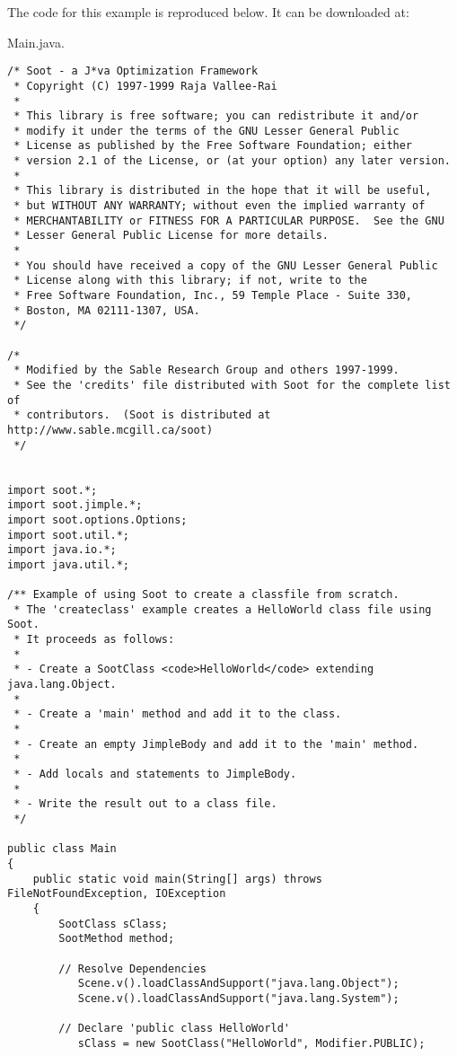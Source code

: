 \documentclass{article}
\begin{document}
The code for this example is reproduced below. It can be downloaded
at:

{Main.java}.

\begin{verbatim}
/* Soot - a J*va Optimization Framework
 * Copyright (C) 1997-1999 Raja Vallee-Rai
 *
 * This library is free software; you can redistribute it and/or
 * modify it under the terms of the GNU Lesser General Public
 * License as published by the Free Software Foundation; either
 * version 2.1 of the License, or (at your option) any later version.
 *
 * This library is distributed in the hope that it will be useful,
 * but WITHOUT ANY WARRANTY; without even the implied warranty of
 * MERCHANTABILITY or FITNESS FOR A PARTICULAR PURPOSE.  See the GNU
 * Lesser General Public License for more details.
 *
 * You should have received a copy of the GNU Lesser General Public
 * License along with this library; if not, write to the
 * Free Software Foundation, Inc., 59 Temple Place - Suite 330,
 * Boston, MA 02111-1307, USA.
 */

/*
 * Modified by the Sable Research Group and others 1997-1999.  
 * See the 'credits' file distributed with Soot for the complete list of
 * contributors.  (Soot is distributed at http://www.sable.mcgill.ca/soot)
 */


import soot.*;
import soot.jimple.*;
import soot.options.Options;
import soot.util.*;
import java.io.*;
import java.util.*;

/** Example of using Soot to create a classfile from scratch.
 * The 'createclass' example creates a HelloWorld class file using Soot.
 * It proceeds as follows:
 *
 * - Create a SootClass <code>HelloWorld</code> extending java.lang.Object.
 *
 * - Create a 'main' method and add it to the class.
 *
 * - Create an empty JimpleBody and add it to the 'main' method.
 *
 * - Add locals and statements to JimpleBody.
 *
 * - Write the result out to a class file.
 */

public class Main
{
    public static void main(String[] args) throws FileNotFoundException, IOException
    {
        SootClass sClass;
        SootMethod method;
        
        // Resolve Dependencies
           Scene.v().loadClassAndSupport("java.lang.Object");
           Scene.v().loadClassAndSupport("java.lang.System");
           
        // Declare 'public class HelloWorld'   
           sClass = new SootClass("HelloWorld", Modifier.PUBLIC);
        

\end{verbatim}
\end{document}
